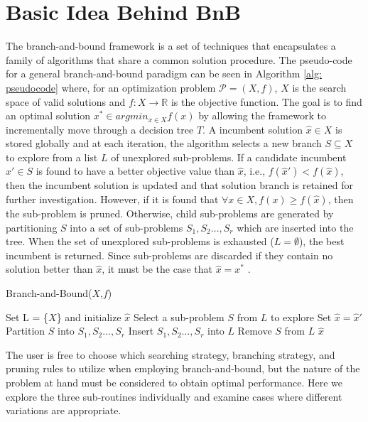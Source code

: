 \section{Basic Idea Behind BnB}
	The branch-and-bound framework is a set of techniques that encapsulates a family of algorithms that share a common solution procedure. 
	The pseudo-code for a general branch-and-bound paradigm can be seen in Algorithm \ref{alg: pseudocode} where, for an optimization problem $\mathscr{P}=(X,f)$, $X$ is the search space of valid solutions and $f: X \rightarrow \mathbb{R}$ is the objective function. 
	The goal is to find an optimal solution $x^* \in argmin_{x\in X}f(x)$ by allowing the framework to incrementally move through a decision tree $T$.
	A incumbent solution $\hat{x}\in X$ is stored globally and at each iteration, the algorithm selects a new branch $S\subseteq X$ to explore from a list $L$ of unexplored sub-problems. 
	If a candidate incumbent $\hat{x}'\in S$ is found to have a better objective value than $\hat{x}$, i.e., $f(\hat{x}') < f(\hat{x})$, then the incumbent solution is updated and that solution branch is retained for further investigation.
	However, if it is found that $\forall x \in X, f(x) \geq f(\hat{x})$, then the sub-problem is pruned. 
	Otherwise, child sub-problems are generated by partitioning $S$ into a set of sub-problems $S_1, S_2 \dots ,S_r$ which are inserted into the tree.
	When the set of unexplored sub-problems is exhausted ($L = \emptyset$), the best incumbent is returned. 
	Since sub-problems are discarded if they contain no solution better than $\hat{x}$, it must be the case that $\hat{x} = x^*$ \cite{morrison2016branch, huang2021branch,virdi2020development}.
		\begin{algorithm}[H]
			\caption{Branch-and-Bound($X$,$f$) }
			\begin{algorithmic}[1]
				\State Set L = \{$X$\} and initialize $\hat{x}$
					\State Select a sub-problem $S$ from $L$ to explore
					\State Set $\hat{x} = \hat{x}'$
					\EndIf
					\State Partition $S$ into $S_1, S_2 \dots ,S_r$
					\State Insert $S_1, S_2 \dots ,S_r$ into $L$
					\EndIf
					\State Remove $S$ from $L$
				\EndWhile
				\State \Return $\hat{x}$
			\end{algorithmic}
		\label{alg: pseudocode}
		\end{algorithm}
	\noindent
		The user is free to choose which searching strategy, branching strategy, and pruning rules to utilize when employing branch-and-bound, but the nature of the problem at hand must be considered to obtain optimal performance. Here we explore the three sub-routines individually and examine cases where different variations are appropriate. 
		
		
		
